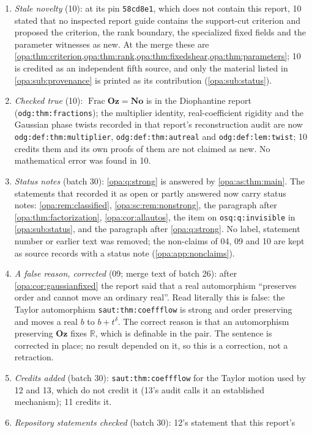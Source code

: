 \documentclass[11pt,oneside]{article}
\numberwithin{equation}{section}
\theoremstyle{definition}
\theoremstyle{remark}
\newcommand{\No}{\mathbf{No}}
\newcommand{\Oz}{\mathbf{Oz}}
\newcommand{\R}{\mathbb R}
\newcommand{\Frac}{\operatorname{Frac}}
\newcommand{\lbl}[1]{\nolinkurl{#1}}
\begin{document}
\begin{enumerate}[itemsep=2pt]
\item \emph{Stale novelty} (10): at its pin \texttt{58cd8e1}, which does not contain
this report, 10 stated that no inspected report guide contains the support-cut
criterion and proposed the criterion, the rank boundary, the specialized fixed
fields and the parameter witnesses as new. At the merge these are
\cref{opa:thm:criterion,opa:thm:rank,opa:thm:fixedshear,opa:thm:parameters}; 10 is
credited as an independent fifth source, and only the material listed in
\cref{opa:sub:provenance} is printed as its contribution (\cref{opa:sub:status}).
\item \emph{Checked true} (10): $\Frac\Oz=\No$ is in the Diophantine report
(\lbl{odg:thm:fractions}); the multiplier identity, real-coefficient rigidity and the
Gaussian phase twists recorded in that report's reconstruction audit are now
\lbl{odg:def:thm:multiplier}, \lbl{odg:def:thm:autreal} and \lbl{odg:def:lem:twist};
10 credits them and its own proofs of them are not claimed as new. No
mathematical error was found in 10.
\item \emph{Status notes} (batch 30): \cref{opa:q:strong} is answered by
\cref{opa:as:thm:main}. The statements that recorded it as open or partly answered now
carry status notes: \cref{opa:rem:classified}, \cref{opa:sc:rem:nonstrong}, the
paragraph after \cref{opa:thm:factorization}, \cref{opa:cor:allautos}, the item on
\lbl{osq:q:invisible} in \cref{opa:sub:status}, and the paragraph after
\cref{opa:q:strong}. No label, statement number or earlier text was removed; the non-claims
of 04, 09 and 10 are kept as source records with a status note
(\cref{opa:app:nonclaims}).
\item \emph{A false reason, corrected} (09; merge text of batch 26): after
\cref{opa:cor:gaussianfixed} the report said that a real automorphism ``preserves order and
cannot move an ordinary real''. Read literally this is false: the Taylor automorphism
\lbl{saut:thm:coeffflow} is strong and order preserving and moves a real $b$ to $b+t^\delta$.
The correct reason is that an automorphism preserving $\Oz$ fixes $\R$, which is definable in
the pair. The sentence is corrected in place; no result depended on it, so this is a
correction, not a retraction.
\item \emph{Credits added} (batch 30): \lbl{saut:thm:coeffflow} for the Taylor motion
used by 12 and 13, which do not credit it (13's audit calls it an established mechanism);
11 credits it.
\item \emph{Repository statements checked} (batch 30): 12's statement that this report's

\end{enumerate}
\end{document}

